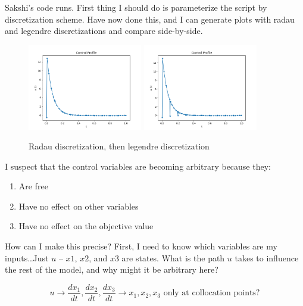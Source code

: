 \documentclass{article}
\begin{document}
Sakshi's code runs. First thing I should do is parameterize the script
by discretization scheme. Have now done this, and I can generate plots with
radau and legendre discretizations and compare side-by-side.

\begin{figure}[!h]
  \centering
  \includegraphics[width=5cm]{radau_control_profile.png}
  \includegraphics[width=5cm]{legendre_control_profile.png}
  \caption{Radau discretization, then legendre discretization}
\end{figure}

I suspect that the control variables are becoming arbitrary because they:
\begin{enumerate}
  \item Are free
  \item Have no effect on other variables
  \item Have no effect on the objective value
\end{enumerate}
How can I make this precise? First, I need to know which variables are my
inputs\ldots Just $u$ -- $x1$, $x2$, and $x3$ are states.
What is the path $u$ takes to influence the rest of the model, and why might
it be arbitrary here?

\[
u \rightarrow \frac{dx_1}{dt}, \frac{dx_2}{dt}, \frac{dx_3}{dt}
\rightarrow x_1, x_2, x_3 \text{ only at collocation points?}
\]
\end{document}
